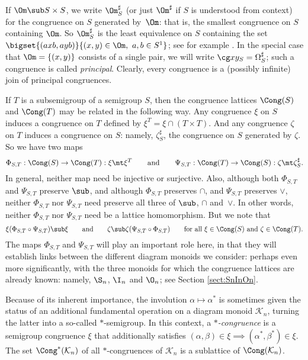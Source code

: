 If $\Om\sub S\times S$, we write $\Om^\sharp_S$ (or just $\Om^\sharp$ if $S$ is
understood from context) for the congruence on $S$ generated by~$\Om$: that is,
the smallest congruence on $S$ containing $\Om$.  So $\Om^\sharp_S$ is the
least equivalence on $S$ containing the set $\bigset{(axb,ayb)}{(x,y)\in\Om,\
a,b\in S^1}$; see for example \cite[Section~1.5]{Howie}.  In the special case
that $\Om=\{(x,y)\}$ consists of a single pair, we will write $\cg
xy_S=\Omega^\sharp_S$; such a congruence is called \emph{principal}.
Clearly, every congruence is a (possibly infinite) join of principal congruences.

If $T$ is a subsemigroup of a semigroup $S$, then the congruence lattices $\Cong(S)$ and $\Cong(T)$ may be related in the following way.  Any congruence $\xi$ on $S$ induces a congruence on $T$ defined by $\xi^T=\xi\cap(T\times T)$.  And any congruence $\zeta$ on $T$ induces a congruence on $S$: namely, $\zeta_S^\sharp$, the congruence on $S$ generated by $\zeta$.  So we have two maps
\[
\Phi_{S,T}:\Cong(S)\to\Cong(T):\xi\mt\xi^T \qquad\text{and}\qquad \Psi_{S,T}:\Cong(T)\to\Cong(S):\zeta\mt\zeta_S^\sharp.
\]
In general, neither map need be injective or surjective.  Also, although both $\Phi_{S,T}$ and $\Psi_{S,T}$ preserve $\sub$, and although $\Phi_{S,T}$ preserves $\cap$, and $\Psi_{S,T}$ preserves $\vee$, neither $\Phi_{S,T}$ nor $\Psi_{S,T}$ need preserve all three of $\sub$, $\cap$ and~$\vee$.  In other words, neither $\Phi_{S,T}$ nor $\Psi_{S,T}$ need be a lattice homomorphism.  But we note that
\[
\xi(\Phi_{S,T}\circ\Psi_{S,T}) \sub \xi \qquad\text{and}\qquad \zeta\sub\zeta(\Psi_{S,T}\circ\Phi_{S,T}) \qquad\text{for all $\xi\in\Cong(S)$ and $\zeta\in\Cong(T)$.}
\]
The maps $\Phi_{S,T}$ and $\Psi_{S,T}$ will play an important role here,
in that they will establish links between the different diagram monoids we consider:
perhaps even more significantly, with the three monoids for which the
congruence lattices are already known: namely, $\S_n$, $\I_n$ and $\O_n$; see
Section \ref{sect:SnInOn}.

Because of its inherent importance, the involution $\alpha\mapsto\alpha^\ast$
is sometimes given the status of an additional fundamental operation on a
diagram monoid $\mathcal{K}_n$, turning the latter into a so-called
$\ast$-semigroup.  In this context, a \emph{$\ast$-congruence} is a semigroup
congruence $\xi$ that additionally satisfies $(\alpha,\beta)\in\xi\implies(\alpha^\ast,\beta^\ast)\in\xi$.  The set $\Cong^*(\mathcal{K}_n)$ of all
$*$-congruences of $\mathcal K_n$ is a sublattice of $\Cong(\mathcal{K}_n)$.







